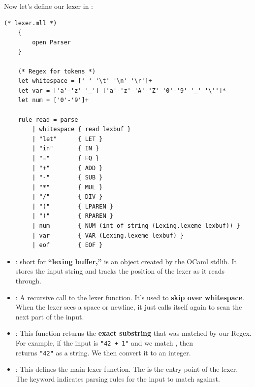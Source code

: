 \newpage 


\begin{Example}

    Now let's define our lexer in :
    
    \begin{lstlisting}[numbers=none]
    (* lexer.mll *)
    {
        open Parser
    }

    (* Regex for tokens *)
    let whitespace = [' ' '\t' '\n' '\r']+
    let var = ['a'-'z' '_'] ['a'-'z' 'A'-'Z' '0'-'9' '_' '\'']*
    let num = ['0'-'9']+

    rule read = parse
        | whitespace { read lexbuf }
        | "let"      { LET }
        | "in"       { IN }
        | "="        { EQ }
        | "+"        { ADD }
        | "-"        { SUB }
        | "*"        { MUL }
        | "/"        { DIV }
        | "("        { LPAREN }
        | ")"        { RPAREN }
        | num        { NUM (int_of_string (Lexing.lexeme lexbuf)) }
        | var        { VAR (Lexing.lexeme lexbuf) }
        | eof        { EOF }
    \end{lstlisting}
    
    \begin{itemize}
        \item {}: short for \textbf{``lexing buffer,''} is an object created by the OCaml stdlib. It stores the input string and tracks the position of the lexer as it reads through.
        
        \item {}: A recursive call to the lexer function. It's used to \textbf{skip over whitespace}. When the lexer sees a space or newline, it just calls itself again to scan the next part of the input.
    
        \item {}: This function returns the \textbf{exact substring} that was matched by our Regex.
         For example, if the input is \texttt{"42 + 1"} and we match , then\\
         returns \texttt{"42"} as a string. We then convert it to an integer.

        \item {}: This defines the main lexer function. The  is the entry point of the lexer. The  keyword indicates parsing rules for the input to match against.
    \end{itemize}
    
    
\end{Example}
        
